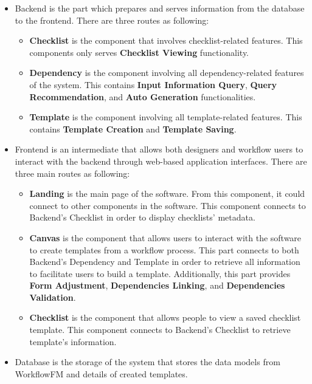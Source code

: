\begin{itemize}
    \item Backend is the part which prepares and serves information from the database to the frontend. There are three routes as following:
    \begin{itemize}
        \item \textbf{Checklist} is the component that involves checklist-related features. This components only serves \textbf{Checklist Viewing} functionality.
        \item \textbf{Dependency} is the component involving all dependency-related features of the system. This contains \textbf{Input Information Query}, \textbf{Query Recommendation}, and \textbf{Auto Generation} functionalities.
        \item \textbf{Template} is the component involving all template-related features. This contains \textbf{Template Creation} and \textbf{Template Saving}. 
    \end{itemize}
    \item Frontend is an intermediate that allows both designers and workflow users to interact with the backend through web-based application interfaces. There are three main routes as following:
    \begin{itemize}
        \item \textbf{Landing} is the main page of the software. From this component, it could connect to other components in the software. This component connects to Backend's Checklist in order to display checklists' metadata.
        \item \textbf{Canvas} is the component that allows users to interact with the software to create templates from a workflow process. This part connects to both Backend's Dependency and Template in order to retrieve all information to facilitate users to build a template.
        Additionally, this part provides \textbf{Form Adjustment}, \textbf{Dependencies Linking}, and \textbf{Dependencies Validation}.
        \item \textbf{Checklist} is the component that allows people to view a saved checklist template. This component connects to Backend's Checklist to retrieve template's information.
    \end{itemize}
    \item Database is the storage of the system that stores the data models from WorkflowFM and details of created templates.
\end{itemize}

